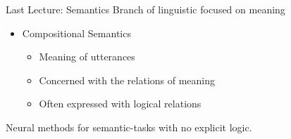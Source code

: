 \documentclass{beamer}
\begin{document}










\begin{frame}{Last Lecture: Semantics}
  Branch of linguistic focused on meaning
  \air 

  \begin{itemize}

  \item Compositional Semantics
    \begin{itemize}
    \item Meaning of utterances
    \item Concerned with the relations of meaning   
    \item Often expressed with logical relations
    \end{itemize}
  \end{itemize}

  \air 
  
  Neural methods for semantic-tasks with no explicit logic.
\end{frame}
\end{document}
